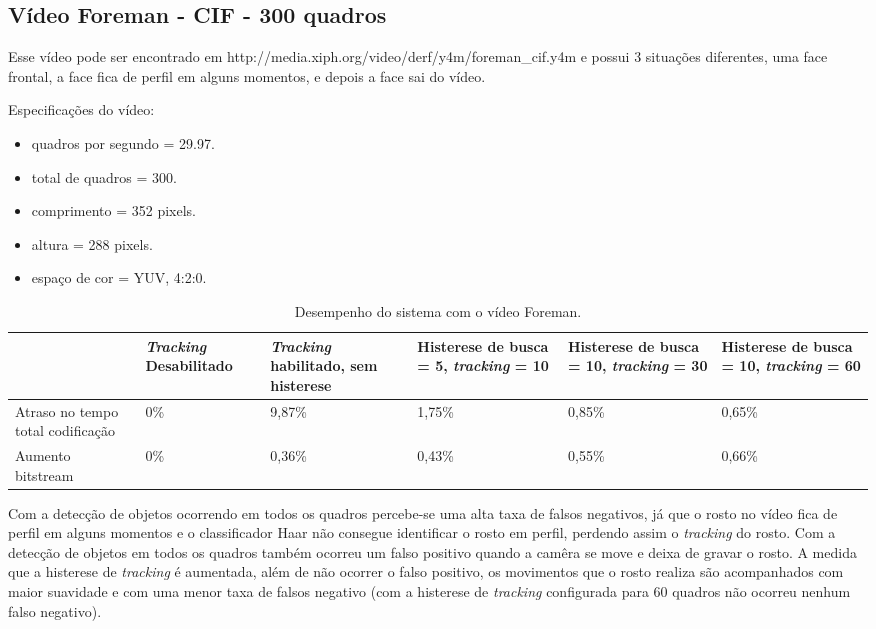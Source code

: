 \documentclass[12pt]{article}
\begin{document}
\subsection{ Vídeo Foreman - CIF - 300 quadros }


Esse vídeo pode ser encontrado em http://media.xiph.org/video/derf/y4m/foreman\_cif.y4m e possui 3 situações diferentes, uma face frontal, a face fica de perfil em alguns momentos, e depois a face sai do vídeo.

Especificações do vídeo:

\begin{itemize}
        \item quadros por segundo = 29.97.
        \item total de quadros    = 300.
        \item comprimento         = 352 pixels.
        \item altura              = 288 pixels.
        \item espaço de cor       = YUV, 4:2:0.
\end{itemize}


\begin{table}[H]
\begin{center}
\begin{tabular}{|p{2.3cm}|p{2.3cm}|p{2.3cm}|p{2.3cm}|p{2.3cm}|p{2.3cm}|}
\hline
\textbf{} & \textbf{\textit{Tracking} Desabilitado} & \textbf{\textit{Tracking} habilitado, sem histerese} & \textbf{Histerese de busca = 5, \textit{tracking} = 10} & \textbf{Histerese de busca = 10, \textit{tracking} = 30} & \textbf{Histerese de busca = 10, \textit{tracking} = 60} \\
\hline
Atraso no tempo total codificação & 0\% & 9,87\% & 1,75\% & 0,85\% & 0,65\% \\
\hline
Aumento bitstream  & 0\% & 0,36\% & 0,43\% & 0,55\% & 0,66\% \\
\hline
\end{tabular}
\caption{Desempenho do sistema com o vídeo Foreman.}
\label{tab:space_overhead}
\end{center}
\end{table}

Com a detecção de objetos ocorrendo em todos os quadros percebe-se uma alta taxa de falsos negativos, já que o rosto no vídeo fica de perfil em alguns momentos e o classificador Haar não consegue identificar o rosto em perfil, perdendo assim o \textit{tracking} do rosto. Com a detecção de objetos em todos os quadros também ocorreu um falso positivo quando a camêra se move e deixa de gravar o rosto. A medida que a histerese de \textit{tracking} é aumentada, além de não ocorrer o falso positivo, os movimentos que o rosto realiza são acompanhados com maior suavidade e com uma menor taxa de falsos negativo (com a histerese de \textit{tracking} configurada para 60 quadros não ocorreu nenhum falso negativo). 
\end{document}

